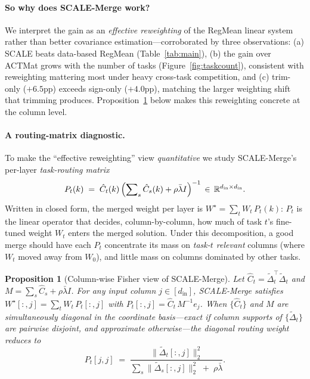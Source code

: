 \documentclass{article} %
\newcommand{\ws}{W^\star}
\newtheorem{proposition}{Proposition}
\begin{document}
\paragraph{So why does SCALE-Merge work?} We interpret the gain as an \emph{effective reweighting} of the RegMean linear system rather than better covariance estimation---corroborated by three observations: (a) SCALE beats data-based RegMean (Table~\ref{tab:main}), (b) the gain over ACTMat grows with the number of tasks (Figure~\ref{fig:taskcount}), consistent with reweighting mattering most under heavy cross-task competition, and (c) trim-only ($+6.5$pp) exceeds sign-only ($+4.0$pp), matching the larger weighting shift that trimming produces. Proposition~\ref{prop:rayleigh} below makes this reweighting concrete at the column level.

\paragraph{A routing-matrix diagnostic.} To make the ``effective reweighting'' view \emph{quantitative} we study SCALE-Merge's per-layer \emph{task-routing matrix}
\begin{equation}
P_t(k) \;=\; \hat C_t(k)\,\Bigl(\sum\nolimits_s \hat C_s(k) + \rho\bar\lambda I\Bigr)^{-1}\,\in\,\mathbb{R}^{d_\text{in}\times d_\text{in}}.
\label{eq:routing}
\end{equation}
Written in closed form, the merged weight per layer is $\ws = \sum_t W_t\, P_t(k)$: $P_t$ is the linear operator that decides, column-by-column, how much of task $t$'s fine-tuned weight $W_t$ enters the merged solution. Under this decomposition, a good merge should have each $P_t$ concentrate its mass on \emph{task-$t$ relevant} columns (where $W_t$ moved away from $W_0$), and little mass on columns dominated by other tasks.

\begin{proposition}[Column-wise Fisher view of SCALE-Merge]
\label{prop:rayleigh}
Let $\hat C_t = \tilde\Delta_t^\top\tilde\Delta_t$ and $M = \sum_s \hat C_s + \rho\bar\lambda I$. For any input column $j\in[d_\text{in}]$, SCALE-Merge satisfies $\ws[:,j] = \sum_t W_t\,P_t[:,j]$ with $P_t[:,j] = \hat C_t\, M^{-1} e_j$. When $\{\hat C_t\}$ and $M$ are simultaneously diagonal in the coordinate basis---exact if column supports of $\{\tilde\Delta_t\}$ are pairwise disjoint, and approximate otherwise---the diagonal routing weight reduces to
\begin{equation}
P_t[j,j] \;=\; \frac{\|\tilde\Delta_t[:,j]\|_2^2}{\sum_s \|\tilde\Delta_s[:,j]\|_2^2 \;+\; \rho\bar\lambda}.
\label{eq:fisher-col}
\end{equation}
\end{proposition}
\end{document}
